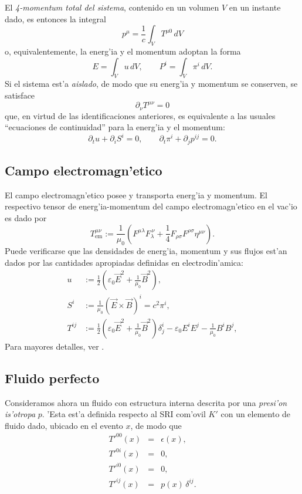 El \textit{4-momentum total del sistema}, contenido en un volumen $V$ en un instante dado, es entonces la integral
\begin{equation}
p^\mu=\frac{1}{c}\int_V T^{\mu 0}\,dV \label{pmTmn}
\end{equation}
o, equivalentemente, la energ'ia y el momentum adoptan la forma
\begin{equation}
E=\int_V u\,dV, \qquad P^i=\int_V \pi^i\,dV.
\end{equation}
Si el sistema est'a \textit{aislado}, de modo que su energ'ia y momentum se conserven, se satisface 
\begin{equation}
 \partial_\nu T^{\mu \nu}=0
\end{equation}
que, en virtud de las identificaciones anteriores, es equivalente a las usuales ``ecuaciones de continuidad'' para la energ'ia y el momentum:
\begin{equation}
 \partial_tu+\partial_iS^i=0, \qquad \partial_t \pi^i+\partial_jp^{ij}=0.
\end{equation}


\subsection{Campo electromagn'etico}
El campo electromagn'etico posee y transporta energ'ia y momentum. El respectivo tensor de energ'ia-momentum del campo electromagn'etico en el vac'io es dado por
\begin{equation}
\boxed{T_\text{em}^{\mu\nu}:=\frac{1}{\mu_0}\left(  F^{\mu\lambda}F_\lambda^{\ \nu}+\frac{1}{4}F_{\rho\sigma}F^{\rho\sigma}\eta^{\mu\nu} \right).}  \label{temsimSI}
\end{equation}
Puede verificarse que las densidades de energ'ia, momentum y sus flujos est'an dados por las cantidades apropiadas definidas en electrodin'amica:
\begin{align}
u &:= \frac{1}{2}\left(\varepsilon_0\vec{E}^2+\frac{1}{\mu_0}\vec{B}^2\right),\label{uTheta}\\
S^i &:= \frac{1}{\mu_0}\left(\vec{E}\times\vec{B}\right)^i=c^2\pi^i, \label{STheta}\\
T^{ij} &:= \frac{1}{2}\left(\varepsilon_0\vec{E}^2+\frac{1}{\mu_0}\vec{B}^2\right)\delta_j^i-\varepsilon_0 E^i E^j -\frac{1}{\mu_0}B^i B^j , \label{TTheta}
\end{align}
Para mayores detalles, ver \cite{7}.


\subsection{Fluido perfecto}
Consideramos ahora un fluido con estructura interna descrita por una \textit{presi'on
is'otropa} $p$. 'Esta est'a definida respecto al SRI com'ovil $K'$ con un elemento de fluido dado, ubicado en el evento $x$, de modo que
\begin{eqnarray}
T'^{00}(x)&=&\epsilon(x) , \label{t00c}\\
T'^{0i}(x) &=&0, \label{t0ic}\\
T'^{i0}(x) &=&0, \label{ti0c}\\
T'^{ij}(x) &=&p(x)\,\delta^{ij} .\label{tijc}
\end{eqnarray}

